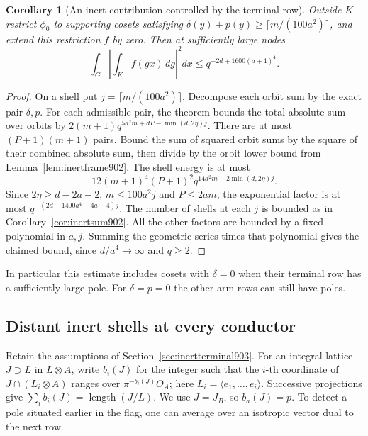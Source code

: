 \documentclass[a4paper,11pt]{article}
\newtheorem{corollary}[proposition]{Corollary}
\theoremstyle{definition}
\theoremstyle{remark}
\numberwithin{equation}{section}
\begin{document}
\begin{corollary}[An inert contribution controlled by the terminal row]
\leavevmode\label{cor:inertterminal903}
Outside \(K\) restrict \(\phi_0\) to supporting cosets satisfying
\(\delta(y)+p(y)\ge\lceil m/(100a^2)\rceil\), and extend this
restriction \(f\) by zero. Then at sufficiently large nodes
\[
           \int_G\left|\int_K f(gx)\,dg\right|^2dx
                              \le q^{-2d+1600(a+1)^4}.
\]
\end{corollary}
\begin{proof}
On a shell put \(j=\lceil m/(100a^2)\rceil\). Decompose each
orbit sum by the exact pair \(\delta,p\). For each admissible
pair, the theorem bounds the total absolute sum over orbits
by \(2(m+1)q^{5a^2m+dP-\min(d,2\eta)j}\).
There are at most \((P+1)(m+1)\) pairs. Bound the sum of
squared orbit sums by the square of their combined absolute
sum, then divide by the orbit lower bound from
Lemma~\ref{lem:inertframe902}. The shell energy is at most
\[
      12(m+1)^4(P+1)^2 q^{14a^2m-2\min(d,2\eta)j}.
\]
Since \(2\eta\ge d-2a-2\), \(m\le100a^2 j\) and
\(P\le2am\), the exponential factor is at most
\(q^{-(2d-1400a^4-4a-4)j}\).
The number of shells at each \(j\) is bounded as in
Corollary~\ref{cor:inertsum902}. All the other factors are
bounded by a fixed polynomial in \(a,j\). Summing the geometric
series times that polynomial gives the claimed bound, since
\(d/a^4\to\infty\) and \(q\ge2\).
\end{proof}

In particular this estimate includes cosets with \(\delta=0\)
when their terminal row has a sufficiently large pole. For
\(\delta=p=0\) the other arm rows can still have poles.
\clearpage

\subsection{Distant inert shells at every conductor}
\label{sec:inerttail904}

Retain the assumptions of Section~\ref{sec:inertterminal903}.
For an integral lattice \(J\supset L\) in \(L\otimes A\), write
\(b_i(J)\) for the integer such that the \(i\)-th coordinate of
\(J\cap (L_i\otimes A)\) ranges over \(\pi^{-b_i(J)}O_A\);
here \(L_i=\langle e_1,\ldots,e_i\rangle\).
Successive projections give \(\sum_i b_i(J)=\operatorname{length}(J/L)\).
We use \(J=J_B\), so \(b_a(J)=p\). To detect a pole situated
earlier in the flag, one can average over an isotropic vector
dual to the next row.
\end{document}
